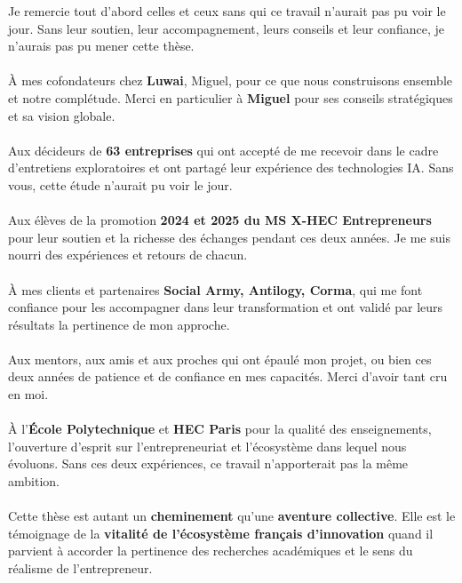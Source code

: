Je remercie tout d’abord celles et ceux sans qui ce travail n’aurait pas pu voir le jour. Sans leur soutien, leur accompagnement, leurs conseils et leur confiance, je n’aurais pas pu mener cette thèse.
\\\\
À mes cofondateurs chez \textbf{Luwai}, Miguel, pour ce que nous construisons ensemble et notre complétude. Merci en particulier à \textbf{Miguel} pour ses conseils stratégiques et sa vision globale.
\\\\
Aux décideurs de \textbf{63 entreprises} qui ont accepté de me recevoir dans le cadre d’entretiens exploratoires et ont partagé leur expérience des technologies IA. Sans vous, cette étude n’aurait pu voir le jour.
\\\\
Aux élèves de la promotion \textbf{2024 et 2025 du MS X-HEC Entrepreneurs} pour leur soutien et la richesse des échanges pendant ces deux années. Je me suis nourri des expériences et retours de chacun.
\\\\
À mes clients et partenaires  \textbf{Social Army, Antilogy, Corma}, qui me font confiance pour les accompagner dans leur transformation et ont validé par leurs résultats la pertinence de mon approche.
\\\\
Aux mentors, aux amis et aux proches qui ont épaulé mon projet, ou bien ces deux années de patience et de confiance en mes capacités. Merci d’avoir tant cru en moi.
\\\\
À l’\textbf{École Polytechnique} et \textbf{HEC Paris} pour la qualité des enseignements, l’ouverture d’esprit sur l’entrepreneuriat et l’écosystème dans lequel nous évoluons. Sans ces deux expériences, ce travail n’apporterait pas la même ambition.
\\\\
Cette thèse est autant un \textbf{cheminement} qu’une \textbf{aventure collective}. Elle est le témoignage de la \textbf{vitalité de l’écosystème français d’innovation} quand il parvient à accorder la pertinence des recherches académiques et le sens du réalisme de l’entrepreneur.
